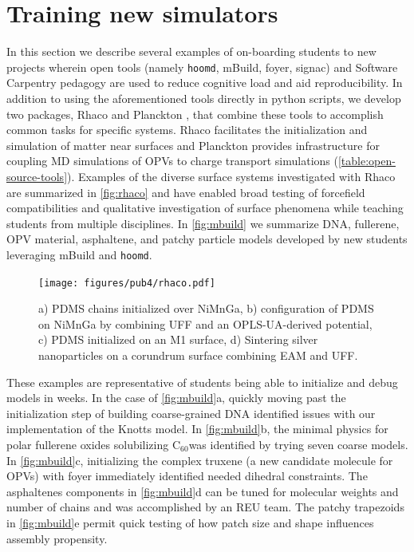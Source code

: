 \section{Training new simulators}\label{s:train}
In this section we describe several examples of on-boarding students to new projects wherein open tools (namely \texttt{hoomd}, mBuild, foyer, signac) and Software Carpentry pedagogy are used to reduce cognitive load and aid reproducibility.
In addition to using the aforementioned tools directly in python scripts, we develop two packages, Rhaco \cite{Rhaco} and Planckton \cite{planckton}, that combine these tools to accomplish common tasks for specific systems.
Rhaco facilitates the initialization and simulation of matter near surfaces and Planckton provides infrastructure for coupling MD simulations of OPVs to charge transport simulations (\autoref{table:open-source-tools}).
Examples of the diverse surface systems investigated with Rhaco are summarized in \autoref{fig:rhaco} and have enabled broad testing of forcefield compatibilities and qualitative investigation of surface phenomena while teaching students from multiple disciplines.
In \autoref{fig:mbuild} we summarize DNA, fullerene, OPV material, asphaltene, and patchy particle models developed by new students leveraging mBuild and \texttt{hoomd}. 
\begin{figure}
    \centering
    \texttt{[image: figures/pub4/rhaco.pdf]}
    \caption{a) PDMS chains initialized over NiMnGa, b) configuration of PDMS on NiMnGa by combining UFF and an OPLS-UA-derived potential, c) PDMS initialized on an M1 surface, d) Sintering silver nanoparticles on a corundrum surface combining EAM and UFF.}\label{fig:rhaco} %
\end{figure}
These examples are representative of students being able to initialize and debug models in weeks.
In the case of \autoref{fig:mbuild}a, quickly moving past the initialization step of building coarse-grained DNA identified issues with our implementation of the Knotts model.
In \autoref{fig:mbuild}b, the minimal physics for polar fullerene oxides solubilizing C$_{60}$was identified by trying seven coarse models. 
In \autoref{fig:mbuild}c, initializing the complex truxene (a new candidate molecule for OPVs) with foyer immediately identified needed dihedral constraints.
The asphaltenes components in \autoref{fig:mbuild}d can be tuned for molecular weights and number of chains and was accomplished by an REU team.
The patchy trapezoids in \autoref{fig:mbuild}e permit quick testing of how patch size and shape influences assembly propensity.
